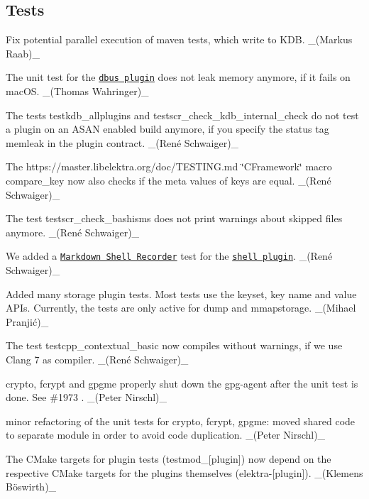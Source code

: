 \subsection*{Tests}


\begin{DoxyItemize}
\item Fix potential parallel execution of maven tests, which write to K\+DB. \+\_\+(\+Markus Raab)\+\_\+
\item The unit test for the \href{https://www.libelektra.org/plugins/dbus}{\tt {\ttfamily dbus} plugin} does not leak memory anymore, if it fails on mac\+OS. \+\_\+(\+Thomas Wahringer)\+\_\+
\item The tests {\ttfamily testkdb\+\_\+allplugins} and {\ttfamily testscr\+\_\+check\+\_\+kdb\+\_\+internal\+\_\+check} do not test a plugin on an A\+S\+AN enabled build anymore, if you specify the status tag {\ttfamily memleak} in the plugin contract. \+\_\+(René Schwaiger)\+\_\+
\item The https\+://master.libelektra.\+org/doc/\+T\+E\+S\+T\+I\+NG.md \char`\"{}\+C\+Framework\char`\"{} macro {\ttfamily compare\+\_\+key} now also checks if the meta values of keys are equal. \+\_\+(René Schwaiger)\+\_\+
\item The test {\ttfamily testscr\+\_\+check\+\_\+bashisms} does not print warnings about skipped files anymore. \+\_\+(René Schwaiger)\+\_\+
\item We added a \href{https://master.libelektra.org/tests/shell/shell_recorder/tutorial_wrapper}{\tt Markdown Shell Recorder} test for the \href{https://www.libelektra.org/plugins/shell}{\tt {\ttfamily shell} plugin}. \+\_\+(René Schwaiger)\+\_\+
\item Added many storage plugin tests. Most tests use the keyset, key name and value A\+P\+Is. Currently, the tests are only active for {\ttfamily dump} and {\ttfamily mmapstorage}. \+\_\+(Mihael Pranjić)\+\_\+
\item The test {\ttfamily testcpp\+\_\+contextual\+\_\+basic} now compiles without warnings, if we use Clang 7 as compiler. \+\_\+(René Schwaiger)\+\_\+
\item crypto, fcrypt and gpgme properly shut down the gpg-\/agent after the unit test is done. See \#1973 . \+\_\+(\+Peter Nirschl)\+\_\+
\item minor refactoring of the unit tests for crypto, fcrypt, gpgme\+: moved shared code to separate module in order to avoid code duplication. \+\_\+(\+Peter Nirschl)\+\_\+
\item The C\+Make targets for plugin tests ({\ttfamily testmod\+\_\+\mbox{[}plugin\mbox{]}}) now depend on the respective C\+Make targets for the plugins themselves ({\ttfamily elektra-\/\mbox{[}plugin\mbox{]}}). \+\_\+(Klemens Böswirth)\+\_\+

\end{DoxyItemize}
